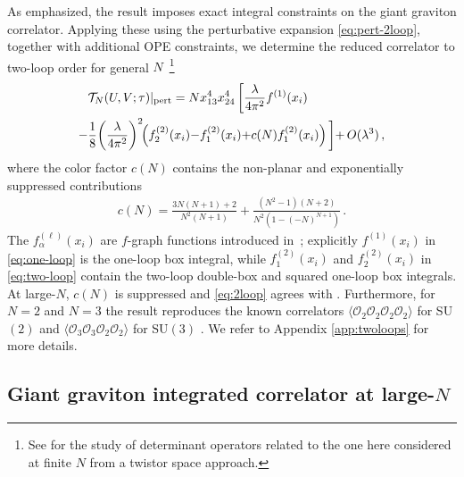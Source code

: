 \documentclass[aps,prl,twocolumn, longbibliography,footinbib,superscriptaddress, preprintnumbers]{revtex4-1}
\newcommand{\<}{\langle}
\renewcommand{\>}{\rangle}
\begin{document}
As emphasized, the result imposes exact integral constraints on the giant graviton correlator. Applying these using the perturbative expansion \eqref{eq:pert-2loop}, together with additional OPE constraints, we determine the reduced correlator to two-loop order for general $N$~\footnote{See \cite{Caron-Huot:2023wdh} for the study of determinant operators related to the one here considered at finite $N$ from a twistor space approach.}
\begin{align}
&\label{eq:2loop} \mathcal{T}_N(U, V; \tau) |_{\rm pert}=N x_{13}^4 x_{24}^4 \, \bigg[\frac{\lambda}{4\pi^2} f^{(1)}(x_i)  \\
 - &  \frac{1}{8}\! \left( {\lambda \over 4\pi^2} \right)^2 \!\! \left(  f^{(2)}_{2}(x_i) {-} f^{(2)}_{1}(x_i)  {+}   c(N) f^{(2)}_{1}(x_i)\right) \bigg]{+}\, O(\lambda^3)\,, \nonumber
\end{align}
where the color factor $c(N)$ contains the non-planar and exponentially suppressed contributions
\begin{align} \label{eq:two-loops-corr2}
    c(N) = \frac{3 N (N+1)+2}{ N^2 (N+1)}+  \frac{ (N^2-1) (N+2)}{N^2(1- (-N)^{N+1})} \, .
\end{align}
The  $f^{(\ell)}_{\alpha}(x_i)$ are $f$-graph functions introduced in~\cite{Eden:2011we, Eden:2012tu}; explicitly $f^{(1)}(x_i)$ in \eqref{eq:one-loop} is the one-loop box integral, while  $f^{(2)}_{1}(x_i)$ and $f^{(2)}_{2}(x_i)$ in \eqref{eq:two-loop} contain the two-loop double-box and squared one-loop box integrals.
 At large-$N$, $c(N)$ is suppressed and \eqref{eq:2loop} agrees with  \cite{Jiang:2019xdz, Jiang:2023uut}. Furthermore, for $N=2$ and $N= 3$ the result reproduces the known correlators $  \langle \mathcal{O}_2
\mathcal{O}_2  \mathcal{O}_2   \mathcal{O}_2  \rangle$ for SU$(2)$ and $    \langle \mathcal{O}_3
\mathcal{O}_3  \mathcal{O}_2  \mathcal{O}_2   \rangle$ for SU$(3)$ \cite{Eden:2012tu, Chicherin:2015edu}.
We refer to Appendix \ref{app:twoloops} for more details.

\vspace{-0.4cm}
\subsection{Giant graviton integrated correlator at large-$N$}
\vspace{-0.2cm}
\end{document}
